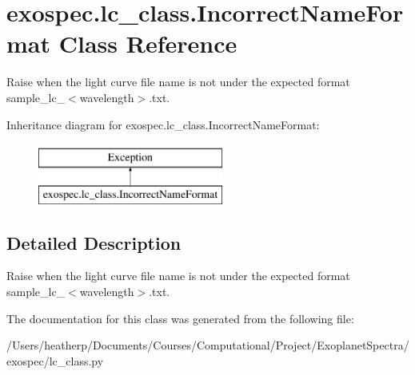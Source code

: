 \hypertarget{classexospec_1_1lc__class_1_1_incorrect_name_format}{}\section{exospec.\+lc\+\_\+class.\+Incorrect\+Name\+Format Class Reference}
\label{classexospec_1_1lc__class_1_1_incorrect_name_format}


Raise when the light curve file name is not under the expected format sample\+\_\+lc\+\_\+$<$wavelength$>$.\+txt.  


Inheritance diagram for exospec.\+lc\+\_\+class.\+Incorrect\+Name\+Format\+:\begin{figure}[H]
\begin{center}
\leavevmode
\includegraphics[height=2.000000cm]{classexospec_1_1lc__class_1_1_incorrect_name_format}
\end{center}
\end{figure}


\subsection{Detailed Description}
Raise when the light curve file name is not under the expected format sample\+\_\+lc\+\_\+$<$wavelength$>$.\+txt. 

The documentation for this class was generated from the following file\+:\begin{DoxyCompactItemize}
\item 
/\+Users/heatherp/\+Documents/\+Courses/\+Computational/\+Project/\+Exoplanet\+Spectra/exospec/lc\+\_\+class.\+py\end{DoxyCompactItemize}
